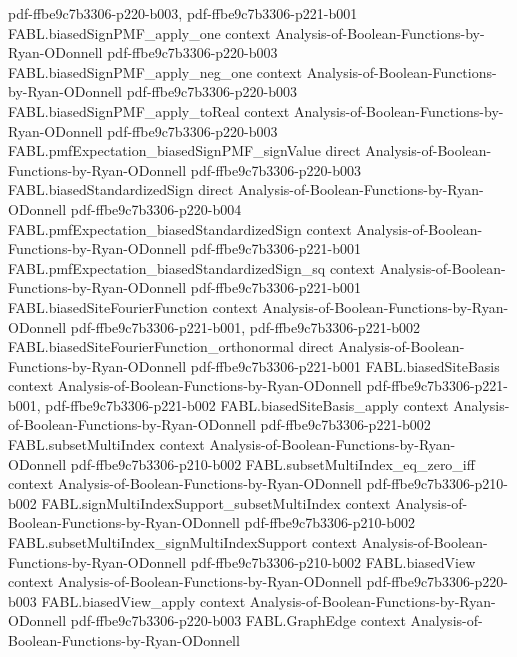 \begin{theorem}
  {pdf-ffbe9c7b3306-p220-b003,
    pdf-ffbe9c7b3306-p221-b001}
\proofstep
  {FABL.biasedSignPMF_apply_one}
  {context}
  {Analysis-of-Boolean-Functions-by-Ryan-ODonnell}
  {pdf-ffbe9c7b3306-p220-b003}
\proofstep
  {FABL.biasedSignPMF_apply_neg_one}
  {context}
  {Analysis-of-Boolean-Functions-by-Ryan-ODonnell}
  {pdf-ffbe9c7b3306-p220-b003}
\proofstep
  {FABL.biasedSignPMF_apply_toReal}
  {context}
  {Analysis-of-Boolean-Functions-by-Ryan-ODonnell}
  {pdf-ffbe9c7b3306-p220-b003}
\proofstep
  {FABL.pmfExpectation_biasedSignPMF_signValue}
  {direct}
  {Analysis-of-Boolean-Functions-by-Ryan-ODonnell}
  {pdf-ffbe9c7b3306-p220-b003}
\proofstep
  {FABL.biasedStandardizedSign}
  {direct}
  {Analysis-of-Boolean-Functions-by-Ryan-ODonnell}
  {pdf-ffbe9c7b3306-p220-b004}
\proofstep
  {FABL.pmfExpectation_biasedStandardizedSign}
  {context}
  {Analysis-of-Boolean-Functions-by-Ryan-ODonnell}
  {pdf-ffbe9c7b3306-p221-b001}
\proofstep
  {FABL.pmfExpectation_biasedStandardizedSign_sq}
  {context}
  {Analysis-of-Boolean-Functions-by-Ryan-ODonnell}
  {pdf-ffbe9c7b3306-p221-b001}
\proofstep
  {FABL.biasedSiteFourierFunction}
  {context}
  {Analysis-of-Boolean-Functions-by-Ryan-ODonnell}
  {pdf-ffbe9c7b3306-p221-b001,
    pdf-ffbe9c7b3306-p221-b002}
\proofstep
  {FABL.biasedSiteFourierFunction_orthonormal}
  {direct}
  {Analysis-of-Boolean-Functions-by-Ryan-ODonnell}
  {pdf-ffbe9c7b3306-p221-b001}
\proofstep
  {FABL.biasedSiteBasis}
  {context}
  {Analysis-of-Boolean-Functions-by-Ryan-ODonnell}
  {pdf-ffbe9c7b3306-p221-b001,
    pdf-ffbe9c7b3306-p221-b002}
\proofstep
  {FABL.biasedSiteBasis_apply}
  {context}
  {Analysis-of-Boolean-Functions-by-Ryan-ODonnell}
  {pdf-ffbe9c7b3306-p221-b002}
\proofstep
  {FABL.subsetMultiIndex}
  {context}
  {Analysis-of-Boolean-Functions-by-Ryan-ODonnell}
  {pdf-ffbe9c7b3306-p210-b002}
\proofstep
  {FABL.subsetMultiIndex_eq_zero_iff}
  {context}
  {Analysis-of-Boolean-Functions-by-Ryan-ODonnell}
  {pdf-ffbe9c7b3306-p210-b002}
\proofstep
  {FABL.signMultiIndexSupport_subsetMultiIndex}
  {context}
  {Analysis-of-Boolean-Functions-by-Ryan-ODonnell}
  {pdf-ffbe9c7b3306-p210-b002}
\proofstep
  {FABL.subsetMultiIndex_signMultiIndexSupport}
  {context}
  {Analysis-of-Boolean-Functions-by-Ryan-ODonnell}
  {pdf-ffbe9c7b3306-p210-b002}
\proofstep
  {FABL.biasedView}
  {context}
  {Analysis-of-Boolean-Functions-by-Ryan-ODonnell}
  {pdf-ffbe9c7b3306-p220-b003}
\proofstep
  {FABL.biasedView_apply}
  {context}
  {Analysis-of-Boolean-Functions-by-Ryan-ODonnell}
  {pdf-ffbe9c7b3306-p220-b003}
\proofstep
  {FABL.GraphEdge}
  {context}
  {Analysis-of-Boolean-Functions-by-Ryan-ODonnell}

\end{theorem}
